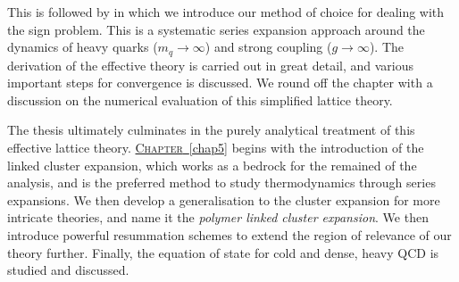 This is followed by  in which we introduce our method of choice
for dealing with the sign problem. This is a systematic series expansion
approach around the dynamics of heavy quarks ($m_q \to \infty$) and strong
coupling ($g \to \infty$). The derivation of the effective theory is carried out
in great detail, and various important steps for convergence is discussed. We
round off the chapter with a discussion on the numerical evaluation of this
simplified lattice theory.

The thesis ultimately culminates in the purely analytical treatment of this
effective lattice theory. \hyperref[chap5]{\mbox{\textsc{Chapter} \ref*{chap5}}}
begins with the introduction of the linked cluster expansion, which works as a
bedrock for the remained of the analysis, and is the preferred method to study
thermodynamics through series expansions. We then develop a generalisation to
the cluster expansion for more intricate theories, and name it the \emph{polymer
  linked cluster expansion}. We then introduce powerful resummation schemes to
extend the region of relevance of our theory further. Finally, the equation of
state for cold and dense, heavy QCD is studied and discussed.
